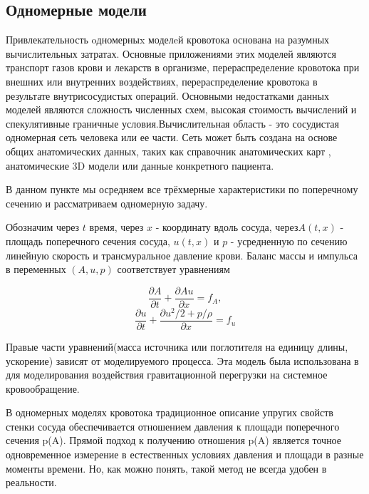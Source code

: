 \documentclass[a4paper, 14pt]{article}
\begin{document}
\subsection{Одномерные модели}

Привлекательность oдномерныx моделeй кровотока основана на разумных вычислительных затратах. Основные приложениями этих моделей являются транспорт газов крови и лекарств в организме, перераспределение кровотока при внешних или внутренних воздействиях, перераспределение кровотока в результате внутрисосудистых операций. Основными недостатками данных моделей являются сложность численных схем, высокая стоимость вычислений и спекулятивные граничные условия.Вычислительная область - это сосудистая одномерная сеть человека или ее части. Сеть может быть создана на основе общих анатомических данных, таких как справочник анатомических карт \cite{bunicheva:2013}, анатомические 3D модели или данные конкретного пациента.

В данном пункте мы осредняем все трёхмерные характеристики по поперечному сечению и рассматриваем одномерную задачу.

Обозначим через $t$ время, через $x$ - координату вдоль сосуда, через$A(t, x)$ - площадь поперечного сечения сосуда, $u(t, x)$ и $p$ - усредненную по сечению линейную скорость и трансмуральное давление крови. Баланс массы и импульса в переменных $(A, u, p)$ соответствует уравнениям

\begin{equation}
	\label{eq:mass-balance}
	\frac{\partial A}{\partial t}+\frac{\partial Au}{\partial x}=f_A,
\end{equation}
\begin{equation}
	\label{eq:momentum-balance}
	\frac{\partial u}{\partial t}+ \frac{\partial u^2/2+p/\rho}{\partial x}=f_u
\end{equation}

Правые части уравнений(масса источника или поглотителя на единицу длины, ускорение) зависят от моделируемого процесса. Эта модель была использована в \cite{bunicheva:2004} для моделирования воздействия гравитационной перегрузки на системное кровообращение. 

В одномерных моделях кровотока традиционное описание упругих свойств стенки сосуда обеспечивается отношением давления к площади поперечного сечения p(A). Прямой подход к получению отношения p(A) является точное одновременное измерение в естественных условиях давления и площади в разные моменты времени. Но, как можно понять, такой метод не всегда удобен в реальности.
\end{document}

